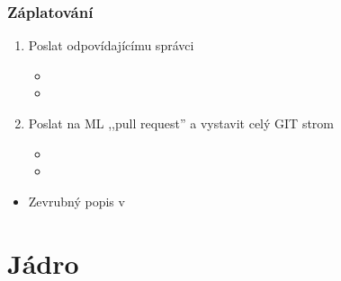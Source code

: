 \begin{frame}
  \frametitle{Záplatování}

  \begin{enumerate}
    \item Poslat odpovídajícímu správci
    \begin{itemize}
      \item {}
      \item {}
    \end{itemize}

    \pause

    \item Poslat na ML ,,pull request'' a vystavit celý GIT strom
    \begin{itemize}
      \item {}
      \item {}
    \end{itemize}
  \end{enumerate}

  \pause

  \begin{itemize}
    \item Zevrubný popis v 
  \end{itemize}

\end{frame}


\section{Jádro}
\frame{\sectionpage}

